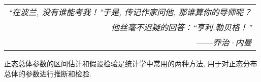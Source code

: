 \begin{flushright}
    \begin{tabular}{r|||}
        \textit{“在波兰, 没有谁能考我！”于是, 传记作家问他, 那谁算你的导师呢？}\\
        \textit{他丝毫不迟疑的回答：“亨利.勒贝格！”}\\
        ——\textit{乔治·内曼}
    \end{tabular}
\end{flushright}

正态总体参数的区间估计和假设检验是统计学中常用的两种方法, 用于对正态分布总体的参数进行推断和检验. 